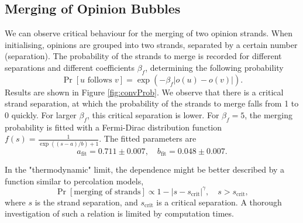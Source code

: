 \documentclass[11pt]{article}
\begin{document}
\subsection{Merging of Opinion Bubbles}

We can observe critical behaviour for the merging of two opinion strands. When initialising, opinions are grouped into two strands, separated by a certain number (separation). The probability of the strands to merge is recorded for different separations and different coefficients $\beta_f$, determining the following probability
$$\Pr[u\text{ follows }v] = \exp(-\beta_f|o(u) - o(v)|).$$
Results are shown in Figure \ref{fig:convProb}. We observe that there is a critical strand separation, at which the probability of the strands to merge falls from 1 to 0 quickly. For larger $\beta_f$, this critical separation is lower. For $\beta_f = 5$, the merging probability is fitted with a Fermi-Dirac distribution function $f(s) = \frac{1}{\exp((s-a)/b) + 1}$. The fitted parameters are
$$a_\mathrm{fit} = 0.711 \pm 0.007,\quad b_\mathrm{fit} = 0.048 \pm 0.007.$$

In the "thermodynamic" limit, the dependence might be better described by a function similar to percolation models,
$$\Pr[\text{merging of strands}] \propto 1 - |s - s_\mathrm{crit}|^\gamma,\quad s > s_\mathrm{crit},$$
where $s$ is the strand separation, and $s_\mathrm{crit}$ is a critical separation. A thorough investigation of such a relation is limited by computation times.
\end{document}
